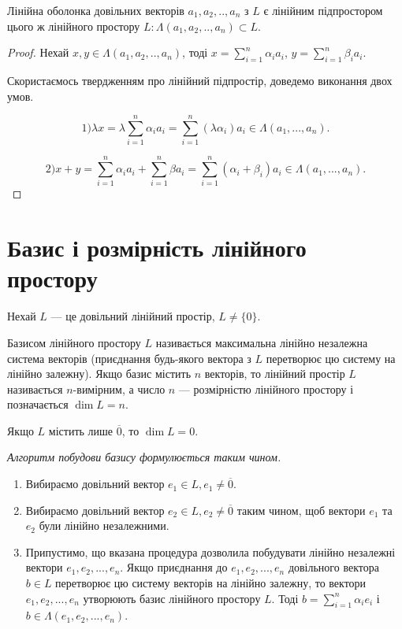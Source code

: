 \begin{claim}
	Лінійна оболонка довільних векторів $a_1, a_2, ..,a_n$ з $L$ є лінійним
	підпростором цього ж лінійного простору $L : \Lambda(a_1, a_2, ..,a_n) \subset L$.
\end{claim}
\begin{proof}
	Нехай $x, y \in \Lambda(a_1, a_2, ..,a_n)$, тоді $x = \sum\limits_{i=1}^n \alpha_i a_i$,
	$y = \sum\limits_{i=1}^n \beta_i a_i$.
	
	Скористаємось твердженням про лінійний підпростір, доведемо виконання
	двох умов.
	
	$$1) \lambda x = \lambda \sum\limits_{i=1}^n \alpha_i a_i = \sum\limits_{i=1}^n (\lambda \alpha_i) a_i \in \Lambda(a_1, ..., a_n).$$
	
	$$2) x+y = \sum\limits_{i=1}^n \alpha_i a_i + \sum\limits_{i=1}^n \beta a_i = \sum\limits_{i=1}^n (\alpha_i + \beta_i) a_i \in \Lambda(a_1, ..., a_n).$$
\end{proof}

\section{Базис і розмірність лінійного простору}

Нехай $L$ --- це довільний лінійний простір, $L \neq \{0\}$. 

\begin{definition}
	Базисом лінійного простору $L$ називається максимальна лінійно
	незалежна система векторів (приєднання будь-якого вектора з $L$ перетворює цю
	систему на лінійно залежну). Якщо базис містить $n$ векторів, то лінійний простір
	$L$ називається $n$-вимірним, а число $n$ --- розмірністю лінійного простору і
	позначається $\dim L = n$.
\end{definition}

\begin{remark}
	Якщо $L$ містить лише $\overline{0}$, то $\dim L = 0$.
\end{remark}

\textit{Алгоритм побудови базису формулюється таким чином.}
\begin{enumerate}
	\item Вибираємо довільний вектор $e_1 \in L, e_1 \neq \overline{0}$.
	
	\item Вибираємо довільний вектор $e_2 \in L, e_2 \neq \overline{0}$ таким чином, щоб вектори $e_1$ та
	$e_2$ були лінійно незалежними.
	
	\item Припустимо, що вказана процедура дозволила побудувати лінійно незалежні
	вектори $e_1, e_2, ..., e_n$. Якщо приєднання до $e_1, e_2, ..., e_n$ довільного вектора $b \in L$
	перетворює цю систему векторів на лінійно залежну, то вектори $e_1, e_2, ..., e_n$
	утворюють базис лінійного простору $L$. Тоді $b = \sum\limits_{i=1}^n \alpha_i e_i$ і $b \in \Lambda(e_1, e_2, ..., e_n)$.
\end{enumerate}

